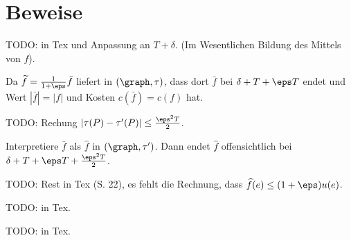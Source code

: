 \section{Beweise}

\begin{standaloneProof}
    TODO: in Tex und Anpassung an $T + \delta$.
    (Im Wesentlichen Bildung des Mittels von $f$).
\end{standaloneProof}

\begin{standaloneProof}
    Da $\widetilde{f} = \frac{1}{1 + \eps} \bar{f}$ liefert 
    in $(\graph, \tau)$, dass dort $\bar{f}$ bei $\delta + T + \eps T$ endet
    und Wert $|\bar{f}| = |f|$ und Kosten $c(\bar{f}) = c(f)$ hat.

    TODO: Rechung $|\tau(P) - \tau'(P)| \leq \frac{\eps^2T}{2}$.

    Interpretiere $\bar{f}$ als $\widehat{f}$ in $(\graph, \tau')$. Dann endet
    $\widehat{f}$ offensichtlich bei $\delta + T + \eps T + \frac{\eps^2T}{2}$.

    TODO: Rest in Tex (S. 22), es fehlt die Rechnung, dass
        $\widehat{f}(e) \leq (1+\eps)u(e)$.
\end{standaloneProof}

\begin{standaloneProof}
    TODO: in Tex.
\end{standaloneProof}

\begin{standaloneProof}
    TODO: in Tex.
\end{standaloneProof}

\endinput
